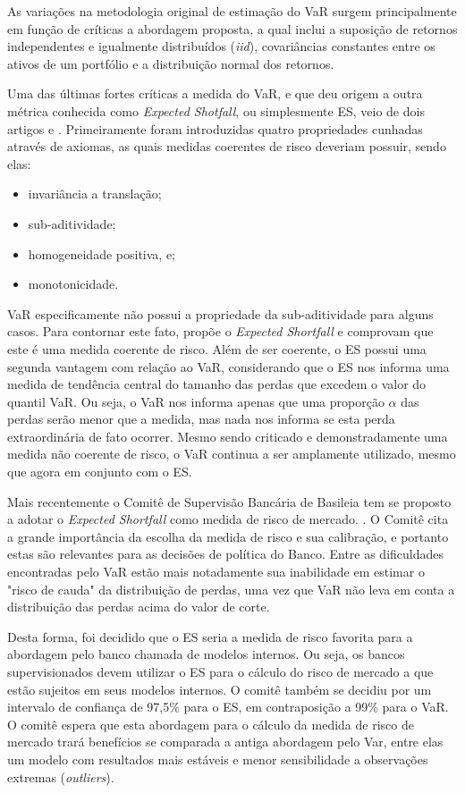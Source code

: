 \documentclass[review]{elsarticle}
\theoremstyle{definition}
\begin{document}
As variações na metodologia original de estimação do VaR surgem principalmente em função de críticas a abordagem proposta, a qual inclui a suposição de retornos independentes e igualmente distribuídos (\emph{iid}), covariâncias constantes entre os ativos de um portfólio e a distribuição normal dos retornos.

Uma das últimas fortes críticas a medida do VaR, e que deu origem a outra métrica conhecida como \emph{Expected Shotfall}, ou simplesmente ES, veio de dois artigos \cite{Artzner1997} e \cite{Artzner1999}. Primeiramente foram introduzidas quatro propriedades cunhadas através de axiomas, as quais medidas coerentes de risco deveriam possuir, sendo elas: 

\begin{itemize}
	\item invariância a translação;
	\item sub-aditividade;
	\item homogeneidade positiva, e;
	\item monotonicidade.
\end{itemize}

VaR especificamente não possui a propriedade da sub-aditividade para alguns casos. Para contornar este fato, \cite{Acerbi2002} propõe o \emph{Expected Shortfall} e comprovam que este é uma medida coerente de risco. Além de ser coerente, o ES possui uma segunda vantagem com relação ao VaR, considerando que o ES nos informa uma medida de tendência central do tamanho das perdas que excedem o valor do quantil VaR. Ou seja, o VaR nos informa apenas que uma proporção $\alpha$ das perdas serão menor que a medida, mas nada nos informa se esta perda extraordinária de fato ocorrer. Mesmo sendo criticado e demonstradamente uma medida não coerente de risco, o VaR continua a ser amplamente utilizado, mesmo que agora em conjunto com o ES. 

Mais recentemente o Comitê de Supervisão Bancária de Basileia tem se proposto a adotar o \emph{Expected Shortfall} como medida de risco de mercado. \cite{BCBS2013a}. O Comitê cita a grande importância da escolha da medida de risco e sua calibração, e portanto estas são relevantes para as decisões de política do Banco. Entre as dificuldades encontradas pelo VaR estão mais notadamente sua inabilidade em estimar o "risco de cauda" da distribuição de perdas, uma vez que VaR não leva em conta a distribuição das perdas acima do valor de corte.

Desta forma, foi decidido que o ES seria a medida de risco favorita para a abordagem pelo banco chamada de modelos internos. Ou seja, os bancos supervisionados devem utilizar o ES para o cálculo do risco de mercado a que estão sujeitos em seus modelos internos. O comitê também se decidiu por um intervalo de confiança de 97,5\% para o ES, em contraposição a 99\% para o VaR. O comitê espera que esta abordagem para o cálculo da medida de risco de mercado trará benefícios se comparada a antiga abordagem pelo Var, entre elas um modelo com resultados mais estáveis e menor sensibilidade a observações extremas (\emph{outliers}).
\end{document}
